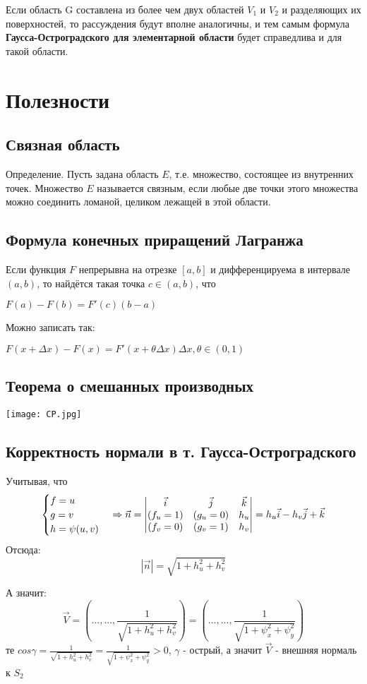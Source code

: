 \documentclass[12pt]{article}
\begin{document}
	Если область G составлена из более чем двух областей
$V_1$ и $V_2$ и разделяющих их поверхностей, то рассуждения будут вполне
аналогичны, и тем самым формула \textbf{Гаусса-Остроградского для элементарной области} будет справедлива и для такой
области.







\newpage
\section{Полезности}
\subsection*{Связная область}\label{eq4}
Определение. Пусть задана область $E$, т.е. множество, состоящее из внутренних точек. Множество $E$ называется связным, если любые две точки этого
множества можно соединить ломаной, целиком лежащей в этой области.

\subsection*{Формула конечных приращений Лагранжа}\label{eq5}	
Если функция $F$ непрерывна на отрезке $[a,b]$  и дифференцируема в интервале $(a,b)$, то найдётся такая точка $ c\in (a,b)$, что
 
	$F(a) - F(b) = F'(c)(b - a)$
	
	Можно записать так:
	
	$F(x + \Delta x) - F(x) = F'(x + \theta\Delta x)\Delta x , \theta \in (0,1) $

\subsection*{Теорема о смешанных производных}\label{eq6}
\texttt{[image: CP.jpg]}	

\subsection*{Корректность нормали в т. Гаусса-Остроградского}\label{eq10}
Учитывая, что 
$$
\begin{cases}
   f = u \\
   g = v \\
   h = \psi(u,v)
\end{cases}
\Rightarrow
\vec{n} = 
\begin{vmatrix}
\vec{i} & \vec{j} & \vec{k} \\
(f_u = 1) & (g_u = 0) & h_u \\
(f_v = 0) & (g_v = 1) & h_v 
\end{vmatrix}
=
\-h_u \vec{i} - h_v \vec{j} + \vec{k}
$$
Отсюда:
$$
|\vec{n}| = \sqrt{1+h_u^2 + h_v^2}
$$

А значит:
$$
\vec{V} = ( ..., ... , \frac{1}{\sqrt{1+h_u^2 + h_v^2}})
=
( ..., ... , \frac{1}{\sqrt{1+\psi_x^2 + \psi_y^2}})
$$
те $cos\gamma = \frac{1}{\sqrt{1+h_u^2 + h_v^2}} = \frac{1}{\sqrt{1+\psi_x^2 + \psi_y^2}}> 0$, $\gamma$ - острый, а значит $\vec{V}$ - внешняя нормаль к $S_2$
\end{document}
